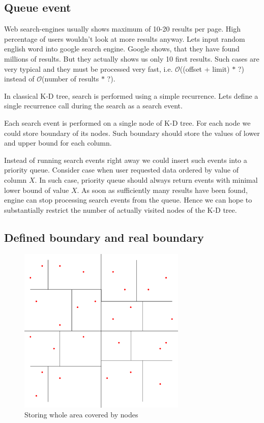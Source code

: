 \documentclass[10pt,a4paper]{article}
\newcommand{\Oh}{\mathcal{O}}
\begin{document}
\subsection{Queue event}
Web search-engines usually shows maximum of 10-20 results per page. High percentage of users wouldn't look at more results anyway. Lets input random english word into google search engine. Google shows, that they have found millions of results. But they actually shows us only 10 first results. Such cases are very typical and they must be processed very fast, i.e. $\Oh$((offset + limit) $*$ ?) instead of $\Oh$(number of results $*$ ?).

In classical K-D tree, search is performed using a simple recurrence. Lets define a single recurrence call during the search as a search event.

Each search event is performed on a single node of K-D tree. For each node we could store boundary of its nodes. Such boundary should store the values of lower and upper bound for each column.

Instead of running search events right away we could insert such events into a priority queue. Consider case when user requested data ordered by value of column $X$. In such case, priority queue should always return events with minimal lower bound of value $X$. As soon as sufficiently many results have been found, engine can stop processing search events from the queue. Hence we can hope to substantially restrict the number of actually visited nodes of the K-D tree.

\subsection{Defined boundary and real boundary}

\begin{figure}
\centering
  \includegraphics[width=8cm]{Figure1}
  \caption{Storing whole area covered by nodes}
  \label{fig:covered}
\end{figure}
\end{document}
